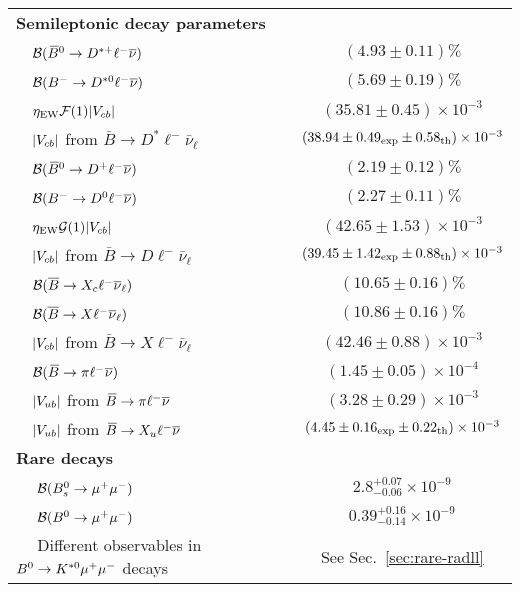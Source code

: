 \begin{longtable}{|l|c|}
\hline
{\bf\boldmath Semileptonic \B decay parameters} & \\
 ~~${\cal B}(\kern 0.18em\overline{\kern -0.18em B}{}^0\to D^{*+}\ell^-\overline{\nu})$ & $(4.93\pm 0.11)\%$\\
 ~~${\cal B}(B^-\to D^{*0}\ell^-\overline{\nu})$ & $(5.69\pm 0.19)\%$\\
 ~~$\eta_{\rm EW}{\cal F}(1)|V_{cb}|$ & $(35.81\pm 0.45)\times 10^{-3}$\\
 ~~$|V_{cb}|$ from $\bar B\to D^*\ell^-\bar\nu_\ell$ & $(38.94\pm
 0.49_{\rm exp}\pm 0.58_{\rm th})\times 10^{-3}$\\
\hline
 ~~${\cal B}(\kern 0.18em\overline{\kern -0.18em B}{}^0\to D^+\ell^-\overline{\nu})$ & $(2.19\pm 0.12)\%$\\
 ~~${\cal B}(B^-\to D^0\ell^-\overline{\nu})$ & $(2.27\pm 0.11)\%$\\
 ~~$\eta_{\rm EW}{\cal G}(1)|V_{cb}|$ & $(42.65 \pm 1.53)\times 10^{-3}$\\
 ~~$|V_{cb}|$ from $\bar B\to D\ell^-\bar\nu_\ell$ & $(39.45\pm 1.42_{\rm
 exp}\pm 0.88_{\rm th})\times 10^{-3}$\\
\hline
 ~~${\cal B}(\bar B\to X_c\ell^-\bar\nu_\ell)$ & $(10.65\pm 0.16)\%$\\
 ~~${\cal B}(\bar B\to X\ell^-\bar\nu_\ell)$ & $(10.86\pm 0.16)\%$\\
 ~~$|V_{cb}|$ from $\bar B\to X\ell^-\bar\nu_\ell$ & $(42.46\pm
 0.88)\times 10^{-3}$\\
\hline
 ~~${\cal B}(\kern 0.18em\overline{\kern -0.18em B}{}\to\pi\ell^-\overline{\nu})$ & $(1.45\pm 0.05)\times 10^{-4}$\\
 ~~$|V_{ub}|$ from $\kern 0.18em\overline{\kern -0.18em B}{}\to\pi\ell^-\overline{\nu}$ & $(3.28\pm 0.29)\times
 10^{-3}$\\
 ~~$|V_{ub}|$ from $\kern 0.18em\overline{\kern -0.18em B}{}\to X_u\ell^-\overline{\nu}$ & $(4.45\pm 0.16_{\rm exp}\pm
 0.22_{\rm th})\times 10^{-3}$\\
\hline
%
{\bf\boldmath Rare \B decays} &   \\
 ~~ ${\cal B}(B^0_s \to \mu^+\mu^-)$ & $2.8^{+0.07}_{-0.06} \times 10^{-9}$ \\
 ~~ ${\cal B}(B^0 \to \mu^+\mu^-)$ & $0.39^{+0.16}_{-0.14} \times 10^{-9}$ \\
 ~~ Different observables in $B^0 \to K^{*0}\mu^+\mu^-$ decays & \multirow{2}{*}{See Sec.~\ref{sec:rare-radll}} \\

\end{longtable}
